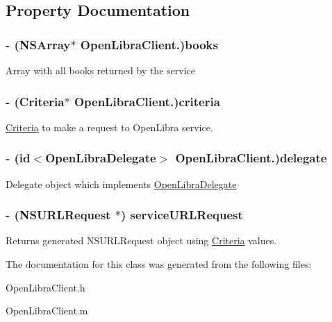\subsection{Property Documentation}
\hypertarget{interface_open_libra_client_a56a391d011a068a6b4c1369a1860b198}{
\subsubsection[{books}]{\setlength{\rightskip}{0pt plus 5cm}-\/ (NSArray$\ast$ OpenLibraClient.)books}}
\label{interface_open_libra_client_a56a391d011a068a6b4c1369a1860b198}
Array with all books returned by the service \hypertarget{interface_open_libra_client_afe8b3b6e59856c494c05b2967a0dffd2}{
\subsubsection[{criteria}]{\setlength{\rightskip}{0pt plus 5cm}-\/ ({\bf Criteria}$\ast$ OpenLibraClient.)criteria}}
\label{interface_open_libra_client_afe8b3b6e59856c494c05b2967a0dffd2}
\hyperlink{interface_criteria}{Criteria} to make a request to OpenLibra service. \hypertarget{interface_open_libra_client_a4d0bb75196cc3cdb9631372a3a09434f}{
\subsubsection[{delegate}]{\setlength{\rightskip}{0pt plus 5cm}-\/ (id$<${\bf OpenLibraDelegate}$>$ OpenLibraClient.)delegate}}
\label{interface_open_libra_client_a4d0bb75196cc3cdb9631372a3a09434f}
Delegate object which implements \hyperlink{protocol_open_libra_delegate-p}{OpenLibraDelegate} \hypertarget{interface_open_libra_client_ab1edd647861203cf4455c9a3711cdd41}{
\subsubsection[{serviceURLRequest}]{\setlength{\rightskip}{0pt plus 5cm}-\/ (NSURLRequest $\ast$) serviceURLRequest}}
\label{interface_open_libra_client_ab1edd647861203cf4455c9a3711cdd41}
Returns generated NSURLRequest object using \hyperlink{interface_criteria}{Criteria} values. 

The documentation for this class was generated from the following files:\begin{DoxyCompactItemize}
\item 
OpenLibraClient.h\item 
OpenLibraClient.m\end{DoxyCompactItemize}
